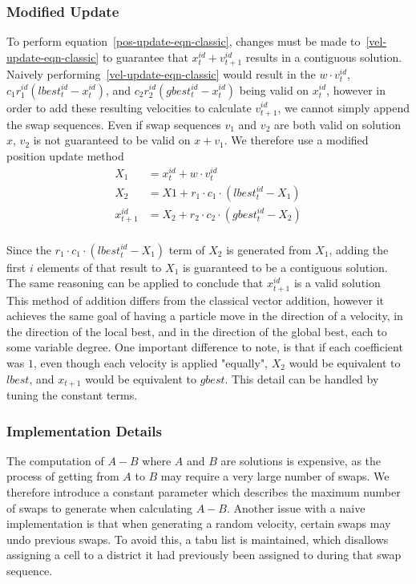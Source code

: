 \documentclass[journal]{IEEEtran}
\begin{document}
\subsubsection{Modified Update}
To perform equation~\ref{pos-update-eqn-classic}, changes must be made
to~\ref{vel-update-eqn-classic} to guarantee that $x_{t}^{id} + v_{t + 1}^{id}$
results in a contiguous solution. Naively
performing~\ref{vel-update-eqn-classic} would result in the $w \cdot v_t^{id}$,
$c_1r_1^{id}(lbest_t^{id} - x_t^{id})$, and $c_2r_2^{id}(gbest_t^{id} -
x_t^{id})$ being valid on $x_t^{id}$, however in order to add these resulting
velocities to calculate $v_{t + 1}^{id}$, we cannot simply append the swap
sequences.  Even if swap sequences $v_1$ and $v_2$ are both valid on solution
$x$, $v_2$ is not guaranteed to be valid on $x + v_1$.  We therefore use a
modified position update method
\begin{equation}
\begin{aligned}
X_1 &= x_{t}^{id} + w \cdot v_{t}^{id}\\
X_2 &= X1 + r_1 \cdot c_1 \cdot (lbest_{t}^{id} - X_1)\\
x_{t + 1}^{id} &= X_2 + r_2 \cdot c_2 \cdot (gbest_t^{id} - X_2)\\
\end{aligned}
\end{equation}

Since the $r_1 \cdot c_1 \cdot (lbest_{t}^{id} - X_1)$ term of $X_2$ is
generated from $X_1$, adding the first $i$ elements of that result to $X_1$ is
guaranteed to be a contiguous solution.  The same reasoning can be applied to
conclude that $x_{t + 1}^{id}$ is a valid solution\\

This method of addition differs from the classical vector addition, however it
achieves the same goal of having a particle move in the direction of a velocity,
in the direction of the local best, and in the direction of the global best,
each to some variable degree.  One important difference to note, is that if each
coefficient was $1$, even though each velocity is applied "equally", $X_2$ would
be equivalent to $lbest$, and $x_{t + 1}$ would be equivalent to $gbest$.  This
detail can be handled by tuning the constant terms.\\

\subsubsection{Implementation Details}
The computation of $A - B$ where $A$ and $B$ are solutions is expensive, as the
process of getting from $A$ to $B$ may require a very large number of swaps.  We
therefore introduce a constant parameter which describes the maximum number of
swaps to generate when calculating $A - B$.  Another issue with a naive
implementation is that when generating a random velocity, certain swaps may undo
previous swaps.  To avoid this, a tabu list is maintained, which disallows
assigning a cell to a district it had previously been assigned to during that
swap sequence.\\
\end{document}
